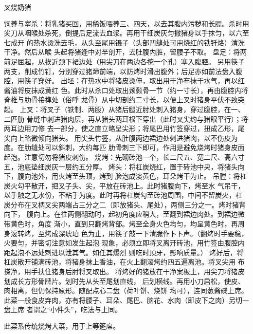 \begin{recipe}{叉烧奶猪}

\ingredients


\preparation

\step 饲养与宰杀：将乳猪买回，用稀饭喂养三、四天，以去其腹内污秽和长膘。杀时用
尖刀从咽喉处杀死，倒提后足流去血浆。再用干细炭灰匀撒猪身以手抹匀，以六至七成开
的热水烫洗去毛，从头至尾用镊子（头部凹缝处可用烧红的铁钎烙）清洗干净。然后从喉
头起将猪逢中对半剖开，去肚腹内脏，留腰子不取。
\step 盘足：将两前足屈起，从挨近颈下裙边处（用尖刀在两边各挖一个孔）塞入腹腔。
另用筷子两支，削成竹钉，分别穿过猪蹄前端，以防烤时滑出腹外；后足亦如前法盘入腹
腔，用筷子穿好。
\step 出坯：在热水中将猪皮烫伸，取出用干净布抹干水气，再以红酱油将皮抹成黄红
色。此时从杀口处取出颈颡骨一节（约一寸长），再由腹腔内将脊椎与肋骨接榫处（俗呼
龙骨）从中切剖约二寸长，以便上叉时猪身平伏不致突起。
\step 上叉：将叉子（铁制、两股）从猪后腿近肘处刺入猪身，穿过腹腔，在一、二匹肋
骨缝中刺进猪肉层，再从猪头两耳根下穿出（此时叉尖约与猪眼平行）；将两耳边用刀修
去一部分，使之直立略呈尖形；将尾巴用竹签穿过，扭成乙形，尾尖向上略微倾向猪头。
用尖头竹签，从肚腹两边裙边处刺进猪肉，以不伤皮为度。在肋缝处可以斜刺，大约每匹
肋骨刺三下即可，作用是避免烧烤时猪身皮面起泡。注意切勿将猪皮刺伤。
\step 烧烤：先砌砖池一个，长二尺五、宽二尺、高六寸五，池底垫细炭灰一层约五分厚。
\step 烤头：将杠炭烧红，置于砖池中央，将猪头向下，腹向池外，用火烤至头顶，烤到
脸泡成淡黄色，耳朵烤干为止。
\step 吊膛：将杠炭火勾平散开，把叉子头、尖，平放在砖池上。此时猪腹向下，烤至水
气吊干，以手触之无水份，不粘手为度。此时再将杠炭勾至砖池周围，中间不留炭火，杠
炭分布在叉柄叉尖两端占三分之二（即放猪头、尾处），两侧三分之一。烤时猪背向下，
腹向上。在往两侧翻动时，起初角度应稍大，至翻到裙边肉处。到裙边微带黄色时，角度
渐小，直到只翻烤背部。烤至全身火色均匀，均呈黄色时，再周身滚转烤，至烤成深琥珀
色为止，用筷子敲一下清脆作卜卜声。（翻烤时手要稳，火要匀，并密切注意如发生起泡
现象，必须立即将叉离开砖池，用竹签由腹腔内距起泡不远处刺进以泄其气。如任其爆烈
则吃时顶牙，影响质量。）
烤好后，将杠炭散开铺满砖池，将猪身抹上香油，在火上翻滚烤约四五遍离池。将叉尖用
布搽净，用手扶住猪身后肘将叉取出。
将烤好的猪放在干净案板上，用尖刀将猪皮划成长方形骨牌片。划时先从头至尾划直线，
后划横线。再用小刀启松，使皮、肉相离，但仍保持原形。随配点心二盘（荷叶饼、烧饼
均可），连同葱酱碟上席。
此菜一般食皮弃肉，亦有将腰子、耳朵、尾巴、脑花、水肉（即皮下之肉）另切一盘上席
者谓之“小件头”，吃法与上同。

\features

此菜系传统烧烤大菜，用于上等筵席。

\end{recipe}

